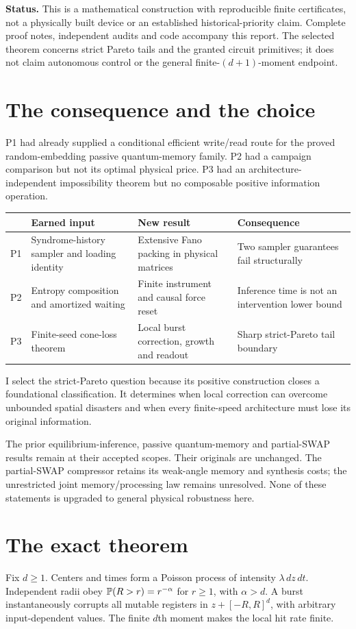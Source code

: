 \documentclass[11pt,a4paper]{article}
\begin{document}
\textbf{Status.}
This is a mathematical construction with reproducible finite certificates, not a physically built device or an established historical-priority claim. Complete proof notes, independent audits and code accompany this report. The selected theorem concerns strict Pareto tails and the granted circuit primitives; it does not claim autonomous control or the general finite-$(d+1)$-moment endpoint.
\newpage
\tableofcontents
\newpage
\section{The consequence and the choice}
P1 had already supplied a conditional efficient write/read route for the proved random-embedding passive quantum-memory family. P2 had a campaign comparison but not its optimal physical price. P3 had an architecture-independent impossibility theorem but no composable positive information operation.

\begin{center}
\begin{tabularx}{\linewidth}{P{13mm}YYY}
\toprule
 & Earned input & New result & Consequence\\
\midrule
P1 & Syndrome-history sampler and loading identity & Extensive Fano packing in physical matrices & Two sampler guarantees fail structurally\\
P2 & Entropy composition and amortized waiting & Finite instrument and causal force reset & Inference time is not an intervention lower bound\\
P3 & Finite-seed cone-loss theorem & Local burst correction, growth and readout & Sharp strict-Pareto tail boundary\\
\bottomrule
\end{tabularx}
\end{center}
I select the strict-Pareto question because its positive construction closes a foundational classification. It determines when local correction can overcome unbounded spatial disasters and when every finite-speed architecture must lose its original information.

The prior equilibrium-inference, passive quantum-memory and partial-SWAP results remain at their accepted scopes. Their originals are unchanged. The partial-SWAP compressor retains its weak-angle memory and synthesis costs; the unrestricted joint memory/processing law remains unresolved. None of these statements is upgraded to general physical robustness here.
\section{The exact theorem}
Fix $d\ge1$. Centers and times form a Poisson process of intensity $\lambda\,dz\,dt$. Independent radii obey $\mathbb P(R>r)=r^{-\alpha}$ for $r\ge1$, with $\alpha>d$. A burst instantaneously corrupts all mutable registers in $z+[-R,R]^d$, with arbitrary input-dependent values. The finite $d$th moment makes the local hit rate finite.
\end{document}
